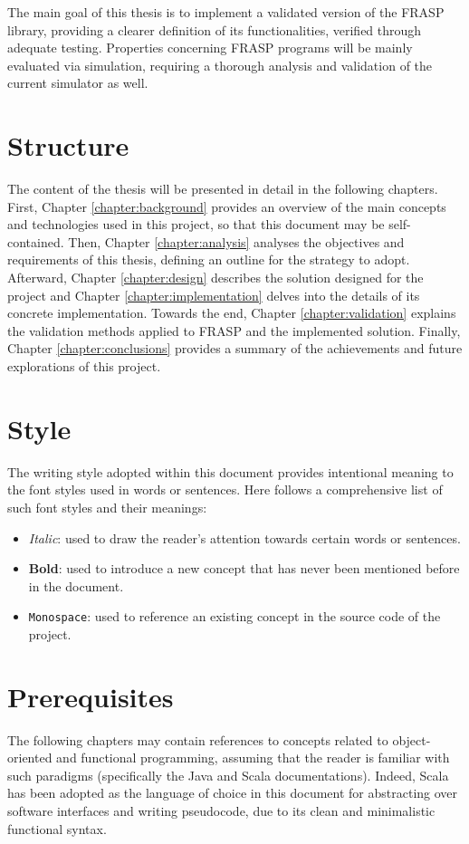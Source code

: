 The main goal of this thesis is to implement a validated version of the FRASP
library, providing a clearer definition of its functionalities, verified
through adequate testing. Properties concerning FRASP programs will be mainly
evaluated via simulation, requiring a thorough analysis and validation of the
current simulator as well.

\section{Structure}
\label{section:introduction:structure}

The content of the thesis will be presented in detail in the following
chapters. First, Chapter \ref{chapter:background} provides an overview of the
main concepts and technologies used in this project, so that this document may
be self-contained. Then, Chapter \ref{chapter:analysis} analyses the objectives
and requirements of this thesis, defining an outline for the strategy to adopt.
Afterward, Chapter \ref{chapter:design} describes the solution designed for the
project and Chapter \ref{chapter:implementation} delves into the details of its
concrete implementation. Towards the end, Chapter \ref{chapter:validation}
explains the validation methods applied to FRASP and the implemented solution.
Finally, Chapter \ref{chapter:conclusions} provides a summary of the
achievements and future explorations of this project.

\section{Style}
\label{section:introduction:style}

The writing style adopted within this document provides intentional meaning to
the font styles used in words or sentences. Here follows a comprehensive list
of such font styles and their meanings:

\begin{itemize}
  \item \textit{Italic}: used to draw the reader's attention towards certain
        words or sentences.
  \item \textbf{Bold}: used to introduce a new concept that has never been
        mentioned before in the document.
  \item \texttt{Monospace}: used to reference an existing concept in the source
        code of the project.
\end{itemize}

\section{Prerequisites}
\label{section:introduction:prerequisites}

The following chapters may contain references to concepts related to
object-orient\-ed and functional programming, assuming that the reader is
familiar with such paradigms (specifically the Java \cite{Java} and Scala
\cite{Scala} documentations). Indeed, Scala has been adopted as the language of
choice in this document for abstracting over software interfaces and writing
pseudocode, due to its clean and minimalistic functional syntax.
